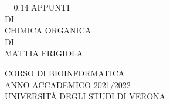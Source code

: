 \documentclass[a4paper,12pt,oneside,]{book}
\newlength{\drop}
\newcommand*{\titleDB}{
\begingroup%
\drop = 0.14\textheight
\centering
\vspace*{\drop}
{\Huge APPUNTI}\\[\baselineskip]
{\Huge DI}\\[\baselineskip]
{\Huge CHIMICA ORGANICA}\\[1.5\baselineskip]
{\LARGE DI}\\[\baselineskip]
{\LARGE MATTIA FRIGIOLA}\par
\vfill
{CORSO DI BIOINFORMATICA}\\[\baselineskip]
{ANNO ACCADEMICO 2021/2022}\\[8\baselineskip]
\vfill
{\small\sffamily UNIVERSITÀ DEGLI STUDI DI VERONA}\par
\endgroup
}
\begin{document}
\begin{titlepage}
	\titleDB
\end{titlepage}
\newpage
\thispagestyle{empty}
\mbox{}
\end{document}
